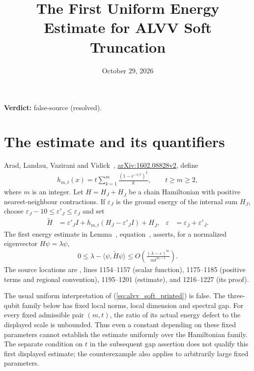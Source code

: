 \documentclass{article}
\title{The First Uniform Energy Estimate for ALVV Soft Truncation}
\author{}
\date{October 29, 2026}
\providecommand{\gapnote}[2]{\par\noindent\textbf{Verdict:} #1 (#2).\par}
\begin{document}
\maketitle
\gapnote{false-source}{resolved}

\section{The estimate and its quantifiers}

Arad, Landau, Vazirani and Vidick~\cite{Arad2016RigorousRG},
\href{https://arxiv.org/abs/1602.08828v2}{arXiv:1602.08828v2}, define
\begin{align}
    h_{m,t}(x)=t\sum_{k=1}^m\frac{(1-e^{-x/t})^k}{k},
    \qquad t\ge m\ge2,
    \label{eq:alvv_soft_scalar}
\end{align}
where $m$ is an integer. Let $H=H_J+H_{\overline J}$ be a chain
Hamiltonian with positive nearest-neighbour contractions. If $\varepsilon_J$
is the ground energy of the internal sum $H_J$, choose
$\varepsilon_J-10\le\varepsilon'_J\le\varepsilon_J$ and set
\begin{align}
    \widetilde H
                & =\varepsilon'_J I+h_{m,t}(H_J-\varepsilon'_J I)+H_{\overline J}, &
    \varepsilon & =\varepsilon_{\overline J}+\varepsilon'_J.
    \label{eq:alvv_soft_physical}
\end{align}
The first energy estimate in Lemma~,
equation~, asserts, for a normalized eigenvector
$H\psi=\lambda\psi$,
\begin{align}
    0\le\lambda-\langle\psi,\widetilde H\psi\rangle
    \le O\!\left(\frac{(\lambda-\varepsilon)^m}{m t^{m-1}}\right).
    \label{eq:alvv_soft_printed}
\end{align}
The source locations are , lines 1154--1157
(scalar function), 1175--1185 (positive terms and regional convention),
1195--1201 (estimate), and 1216--1227 (its proof).

The usual uniform interpretation of (\ref{eq:alvv_soft_printed}) is false.
The three-qubit family below has fixed local norms, local dimension and
spectral gap. For every fixed admissible pair $(m,t)$, the ratio of its
actual energy defect to the displayed scale is unbounded. Thus even a
constant depending on these fixed parameters cannot establish the estimate
uniformly over the Hamiltonian family. The separate condition on $t$ in the
subsequent gap assertion does not qualify this first displayed estimate;
the counterexample also applies to arbitrarily large fixed parameters.
\end{document}
